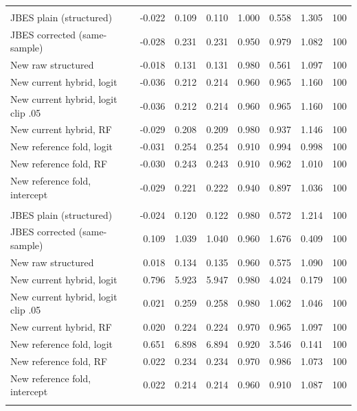 {\begin{longtable}{lrrrrrrr}
\endhead
\bottomrule
\endlastfoot
\multicolumn{8}{l}{\textit{degree $d=1$}} \\
\quad JBES plain (structured) & -0.022 & 0.109 & 0.110 & 1.000 & 0.558 & 1.305 & 100 \\
\quad JBES corrected (same-sample) & -0.028 & 0.231 & 0.231 & 0.950 & 0.979 & 1.082 & 100 \\
\quad New raw structured & -0.018 & 0.131 & 0.131 & 0.980 & 0.561 & 1.097 & 100 \\
\quad New current hybrid, logit & -0.036 & 0.212 & 0.214 & 0.960 & 0.965 & 1.160 & 100 \\
\quad New current hybrid, logit clip .05 & -0.036 & 0.212 & 0.214 & 0.960 & 0.965 & 1.160 & 100 \\
\quad New current hybrid, RF & -0.029 & 0.208 & 0.209 & 0.980 & 0.937 & 1.146 & 100 \\
\quad New reference fold, logit & -0.031 & 0.254 & 0.254 & 0.910 & 0.994 & 0.998 & 100 \\
\quad New reference fold, RF & -0.030 & 0.243 & 0.243 & 0.910 & 0.962 & 1.010 & 100 \\
\quad New reference fold, intercept & -0.029 & 0.221 & 0.222 & 0.940 & 0.897 & 1.036 & 100 \\
\addlinespace
\multicolumn{8}{l}{\textit{degree $d=2$}} \\
\quad JBES plain (structured) & -0.024 & 0.120 & 0.122 & 0.980 & 0.572 & 1.214 & 100 \\
\quad JBES corrected (same-sample) & 0.109 & 1.039 & 1.040 & 0.960 & 1.676 & 0.409 & 100 \\
\quad New raw structured & 0.018 & 0.134 & 0.135 & 0.960 & 0.575 & 1.090 & 100 \\
\quad New current hybrid, logit & 0.796 & 5.923 & 5.947 & 0.980 & 4.024 & 0.179 & 100 \\
\quad New current hybrid, logit clip .05 & 0.021 & 0.259 & 0.258 & 0.980 & 1.062 & 1.046 & 100 \\
\quad New current hybrid, RF & 0.020 & 0.224 & 0.224 & 0.970 & 0.965 & 1.097 & 100 \\
\quad New reference fold, logit & 0.651 & 6.898 & 6.894 & 0.920 & 3.546 & 0.141 & 100 \\
\quad New reference fold, RF & 0.022 & 0.234 & 0.234 & 0.970 & 0.986 & 1.073 & 100 \\
\quad New reference fold, intercept & 0.022 & 0.214 & 0.214 & 0.960 & 0.910 & 1.087 & 100 \\
\addlinespace
\end{longtable}
}
